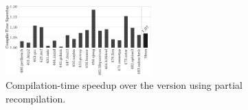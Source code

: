 
\begin{figure}[h]
  \centering
  \includegraphics[width=0.5\textwidth]{src/deeplearning/figs/compilation-time-speedup.pdf}
  \caption{Compilation-time speedup over the version using partial recompilation.}
  \label{fig:compilation-time-speedup}
\end{figure}

